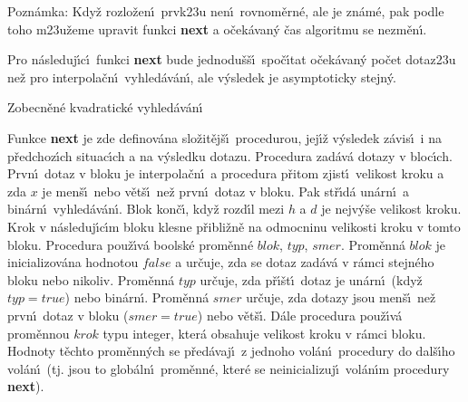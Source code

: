 \flushpar Pozn\'amka: Kdy\v z rozlo\v zen\'\i\ prvk\accent23u nen\'\i\ 
rovnom\v ern\'e, ale je zn\'a\-m\'e, pak podle toho m\accent23u\v zeme  
upravit funkci {\bf next} a o\v cek\'avan\'y \v cas algoritmu se 
nezm\v en\'\i .
\medskip

\flushpar Pro n\'asleduj\'\i c\'\i\ funkci {\bf next} bude 
jednodu\v s\v s\'\i\ spo\v c\'\i tat o\v cek\'ava\-n\'y po\v cet dotaz\accent23u ne\v z 
pro interpola\v cn\'\i\ vyhled\'av\'an\'\i , ale v\'ysledek je 
asymptoticky stejn\'y.

\subhead
Zobecn\v en\'e kvadratick\'e vyhled\'av\'an\'\i
\endsubhead

\flushpar Funkce {\bf next }
je zde definov\'ana slo\v zit\v ej\v s\'\i\ procedurou, jej\'\i\v z v\'y\-sle\-dek 
z\'avis\'\i\ i na p\v redcho\-z\'\i ch situac\'\i ch a na v\'ysledku dotazu.
Procedura zad\'av\'a dotazy v bloc\'\i ch. Prvn\'\i\ dotaz v bloku je 
interpola\v cn\'\i\ a procedura p\v ritom zjist\'\i\ velikost kroku a 
zda $x$ je men\v s\'\i\ nebo v\v et\v s\'\i\ ne\v z prvn\'\i\ dotaz v bloku.  
Pak st\v r\'\i d\'a un\'arn\'\i\ a bin\'arn\'\i\ vy\-hled\'av\'an\'\i . Blok kon\v c\'\i , 
kdy\v z rozd\'\i l mezi $h$ a $d$ je nejv\'y\v se velikost 
kroku. Krok v n\'asleduj\'\i c\'\i m bloku klesne 
p\v ribli\v zn\v e na odmoc\-ninu velikosti kroku v tomto bloku. 
Procedura pou\v z\'\i v\'a boolsk\'e pro\-m\v enn\'e $blok$, $typ$, $
smer$. 
Prom\v enn\'a $blok$ je inicializov\'ana hodnotou $false$ a ur\v cuje, 
zda se dotaz zad\'av\'a v r\'amci stejn\'eho bloku nebo nikoliv. 
Prom\v enn\'a $typ$ ur\v cuje, zda p\v r\'\i\v st\'\i\ dotaz je un\'arn\'\i\ (kdy\v z 
$typ=true$) nebo bin\'arn\'\i . Prom\v enn\'a $smer$ ur\v cuje, zda 
dotazy jsou men\v s\'\i\ ne\v z prvn\'\i\ dotaz v bloku ($smer=tr
ue$) 
nebo v\v et\v s\'\i . D\'ale procedura pou\v z\'\i v\'a prom\v ennou $
krok$ 
typu integer, kter\'a obsahuje velikost kroku v r\'amci 
bloku. Hodnoty t\v echto pro\-m\v en\-n\'ych se p\v red\'avaj\'\i\ z jednoho 
vol\'an\'\i\ procedury do dal\v s\'\i ho vol\'an\'\i\ (tj. jsou to 
glob\'aln\'\i\ prom\v enn\'e, kter\'e se neinicializuj\'\i\ vol\'an\'\i m 
procedury {\bf next}). 
\medskip

